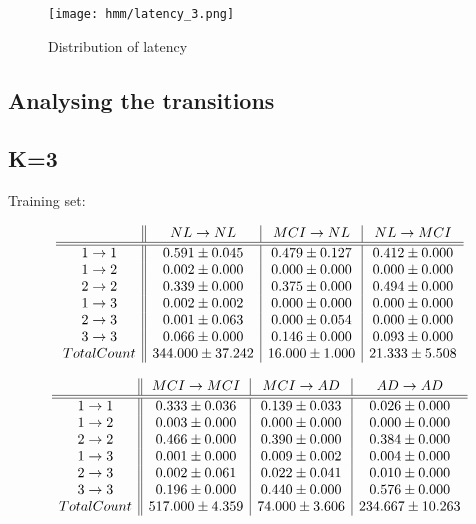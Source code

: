 \documentclass[12pt,a4paper]{article}
\begin{document}
\begin{figure}[H]
  \texttt{[image: hmm/latency\_3.png]}
  \caption{Distribution of latency}  
\end{figure}


\subsection{Analysing the transitions}
\label{sec:an-trans}

\subsection{K=3}

Training set:

\[ \begin{array}{ c || c | c | c }
 & NL \rightarrow NL & MCI \rightarrow NL & NL \rightarrow MCI \\
\hline
\hline
1 \rightarrow 1 & 0.591 \pm 0.045 & 0.479 \pm 0.127 & 0.412 \pm 0.000 \\
1 \rightarrow 2 & 0.002 \pm 0.000 & 0.000 \pm 0.000 & 0.000 \pm 0.000 \\
2 \rightarrow 2 & 0.339 \pm 0.000 & 0.375 \pm 0.000 & 0.494 \pm 0.000 \\
1 \rightarrow 3 & 0.002 \pm 0.002 & 0.000 \pm 0.000 & 0.000 \pm 0.000 \\
2 \rightarrow 3 & 0.001 \pm 0.063 & 0.000 \pm 0.054 & 0.000 \pm 0.000 \\
3 \rightarrow 3 & 0.066 \pm 0.000 & 0.146 \pm 0.000 & 0.093 \pm 0.000 \\
Total Count & 344.000 \pm 37.242 & 16.000 \pm 1.000 & 21.333 \pm 5.508\\
\end{array} \]

\[ \begin{array}{ c || c | c | c } 
& MCI \rightarrow MCI & MCI \rightarrow AD & AD \rightarrow AD \\
\hline
\hline
1 \rightarrow 1 & 0.333 \pm 0.036 & 0.139 \pm 0.033 & 0.026 \pm 0.000 \\
1 \rightarrow 2 & 0.003 \pm 0.000 & 0.000 \pm 0.000 & 0.000 \pm 0.000 \\
2 \rightarrow 2 & 0.466 \pm 0.000 & 0.390 \pm 0.000 & 0.384 \pm 0.000 \\
1 \rightarrow 3 & 0.001 \pm 0.000 & 0.009 \pm 0.002 & 0.004 \pm 0.000 \\
2 \rightarrow 3 & 0.002 \pm 0.061 & 0.022 \pm 0.041 & 0.010 \pm 0.000 \\
3 \rightarrow 3 & 0.196 \pm 0.000 & 0.440 \pm 0.000 & 0.576 \pm 0.000 \\
Total Count & 517.000 \pm 4.359 & 74.000 \pm 3.606 & 234.667 \pm 10.263 \\
\end{array} \]
\end{document}
